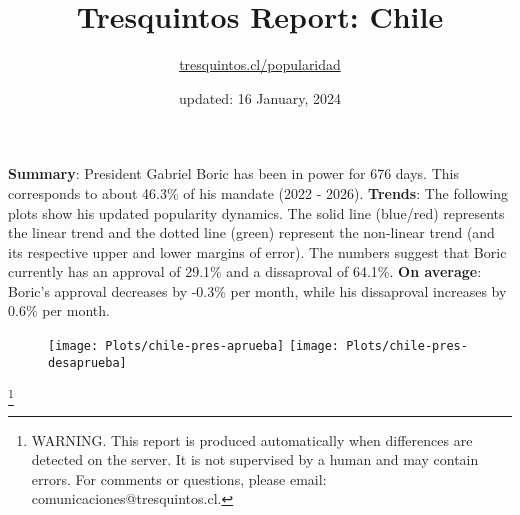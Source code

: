 \documentclass[
]{article}
\title{Tresquintos Report: Chile}
\subtitle{\href{https://tresquintos.cl}{tresquintos.cl/popularidad}}
\author{}
\date{\vspace{-2.5em}updated: 16 January, 2024}
\begin{document}
\maketitle

\addtolength{\headheight}{1.0cm} 
\pagestyle{fancy} 
\renewcommand{\headrulewidth}{0pt}

\textbf{Summary}: President Gabriel Boric has been in power for 676
days. This corresponds to about 46.3\% of his mandate (2022 - 2026).
\textbf{Trends}: The following plots show his updated popularity
dynamics. The solid line (blue/red) represents the linear trend and the
dotted line (green) represent the non-linear trend (and its respective
upper and lower margins of error). The numbers suggest that Boric
currently has an approval of 29.1\% and a dissaproval of 64.1\%.
\textbf{On average}: Boric's approval decreases by -0.3\% per month,
while his dissaproval increases by 0.6\% per month.

\begin{figure}

{\centering \texttt{[image: Plots/chile-pres-aprueba]} \texttt{[image: Plots/chile-pres-desaprueba]} 

}

\end{figure}

\let\thefootnote\relax

\footnote{WARNING. This report is produced automatically when differences are detected on the server. It is not supervised by a human and may contain errors. For comments or questions, please email: comunicaciones@tresquintos.cl.}
\end{document}
